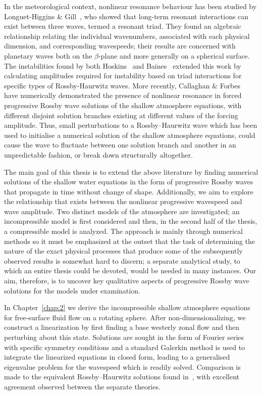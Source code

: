 In the meteorological context, nonlinear resonance behaviour has been studied by Longuet-Higgins \& Gill~\cite{Longuet:RIP}, who showed that long-term resonant interactions can exist between three waves, termed a resonant triad. They found an algebraic relationship relating the individual wavenumbers, associated with each physical dimension, and corresponding wavespeeds; their results are concerned with planetary waves both on the $\beta$-plane and more generally on a spherical surface. The instabilities found by both Hoskins~\cite{Hoskins:SRH} and Baines~\cite{Baines:SPW} extended this work by calculating amplitudes required for instability based on triad interactions for specific types of Rossby-Haurwitz waves. More recently, Callaghan \& Forbes~\cite{Callaghan:NPR} have numerically demonstrated the presence of nonlinear resonance in forced progressive Rossby wave solutions of the shallow atmosphere equations, with different disjoint solution branches existing at different values of the forcing amplitude. Thus, small perturbations to a Rossby--Haurwitz wave which has been used to initialise a numerical solution of the shallow atmosphere equations, could cause the wave to fluctuate between one solution branch and another in an unpredictable fashion, or break down structurally altogether.

The main goal of this thesis is to extend the above literature by finding numerical solutions of the shallow water equations in the form of progressive Rossby waves that propagate in time without change of shape. Additionally, we aim to explore the relationship that exists between the nonlinear progressive wavespeed and wave amplitude. Two distinct models of the atmosphere are investigated; an incompressible model is first considered and then, in the second half of the thesis, a compressible model is analyzed. The approach is mainly through numerical methods so it must be emphasized at the outset that the task of determining the nature of the exact physical processes that produce some of the subsequently observed results is somewhat hard to discern; a separate analytical study, to which an entire thesis could be devoted, would be needed in many instances. Our aim, therefore, is to uncover key qualitative aspects of progressive Rossby wave solutions for the models under examination.

In Chapter~\ref{chap:2} we derive the incompressible shallow atmosphere equations for free-surface fluid flow on a rotating sphere. After non-dimensionalizing, we construct a linearization by first finding a base westerly zonal flow and then perturbing about this state. Solutions are sought in the form of Fourier series with specific symmetry conditions and a standard Galerkin method is used to integrate the linearized equations in closed form, leading to a generalised eigenvalue problem for the wavespeed which is readily solved. Comparison is made to the equivalent Rossby--Haurwitz solutions found in~\cite{Haurwitz:MAD}, with excellent agreement observed between the separate theories.

